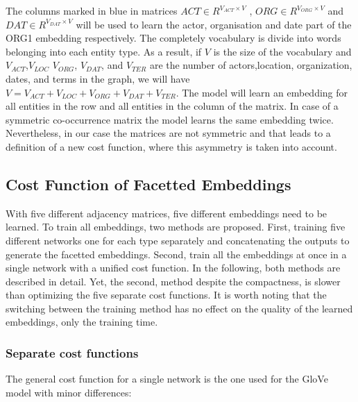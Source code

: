 The columns marked in blue in matrices $ACT\in R^{V_{ACT}\times V}$ , $ORG\in R^{V_{ORG}\times V}$  and $DAT\in R^{V_{DAT}\times V}$ will be used to learn the actor, organisation and date part of the ORG1 embedding respectively. The completely vocabulary is divide into words belonging into each entity type. As a result, if $V$ is the size of the vocabulary and $V_{ACT}$,$V_{LOC}$ $V_{ORG}$, $V_{DAT}$, and $V_{TER}$  are the number of actors,location, organization, dates, and terms in the graph, we will have $V=V_{ACT}+V_{LOC}+V_{ORG}+V_{DAT}+V_{TER}$. The model will learn an embedding for all entities in the row and all entities in the column of the matrix. In case of a symmetric co-occurrence matrix the model learns the same embedding twice. Nevertheless, in our case the matrices are not symmetric and that leads to a definition of a new cost function, where this asymmetry is taken into account.  
\subsection{Cost Function of Facetted Embeddings}
\label{sec:facetted_embeddings}
With five different adjacency matrices, five different embeddings need to be learned. To train all embeddings, two methods are proposed. First, training five different networks one for each type separately and concatenating the outputs to generate the facetted embeddings. Second, train all the embeddings at once in a single network with a unified cost function. In the following, both methods are described in detail. Yet, the second, method despite the compactness, is slower than optimizing the five separate cost functions. It is worth noting that the switching between the training method has no effect on the quality of the learned embeddings, only the training time.\\
\subsubsection{Separate cost functions}
\label{sec:normal_cost}

The general cost function for a single network is the one used for the GloVe model with minor differences: 

